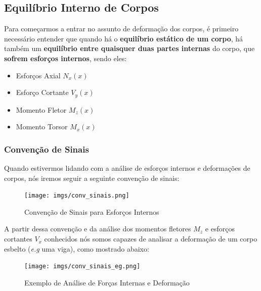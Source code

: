 \documentclass{article}
\begin{document}
\subsection{Equilíbrio Interno de Corpos}
Para começarmos a entrar no assunto de deformação dos corpos, é primeiro necessário entender que quando há o \textbf{equilíbrio estático de um corpo}, há também um \textbf{equilíbrio entre quaisquer duas
    partes internas} do corpo, que \textbf{sofrem esforços internos}, sendo eles:
\begin{itemize}
    \item Esforços Axial $N_x(x)$
    \item Esforço Cortante $V_y(x)$
    \item Momento Fletor $M_z(x)$
    \item Momento Torsor $M_x(x)$
\end{itemize}

\subsubsection{Convenção de Sinais}
Quando estivermos lidando com a análise de esforços internos e deformações de corpos, nós iremos seguir a seguinte convenção de sinais:
\begin{figure}[h]
    \centering
    \texttt{[image: imgs/conv\_sinais.png]}
    \caption{Convenção de Sinais para Esforços Internos}
    \label{fig:conv_de_sinais_esf_intern}
\end{figure}


A partir dessa convenção e da análise dos momentos fletores $M_z$ e esforços cortantes $V_x$ conhecidos nós somos capazes de analisar a deformação de um corpo esbelto (\emph{e.g} uma viga),
como mostrado abaixo:
\begin{figure}[h]
    \centering
    \texttt{[image: imgs/conv\_sinais\_eg.png]}
    \caption{Exemplo de Análise de Forças Internas e Deformação}
\end{figure}
\end{document}

